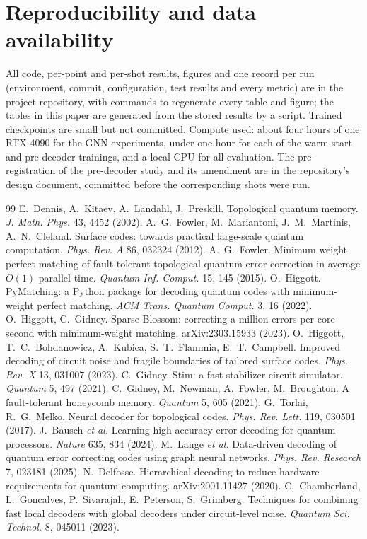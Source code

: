\documentclass[11pt]{article}
\begin{document}
\section*{Reproducibility and data availability}
All code, per-point and per-shot results, figures and one record per run (environment, commit, configuration, test results and every metric) are in the project repository, with commands to regenerate every table and figure; the tables in this paper are generated from the stored results by a script. Trained checkpoints are small but not committed. Compute used: about four hours of one RTX 4090 for the GNN experiments, under one hour for each of the warm-start and pre-decoder trainings, and a local CPU for all evaluation. The pre-registration of the pre-decoder study and its amendment are in the repository's design document, committed before the corresponding shots were run.

\begin{thebibliography}{99}\small
{} E.~Dennis, A.~Kitaev, A.~Landahl, J.~Preskill. Topological quantum memory. \emph{J. Math. Phys.} 43, 4452 (2002).
 A.~G.~Fowler, M.~Mariantoni, J.~M.~Martinis, A.~N.~Cleland. Surface codes: towards practical large-scale quantum computation. \emph{Phys. Rev. A} 86, 032324 (2012).
 A.~G.~Fowler. Minimum weight perfect matching of fault-tolerant topological quantum error correction in average $O(1)$ parallel time. \emph{Quantum Inf. Comput.} 15, 145 (2015).
 O.~Higgott. PyMatching: a Python package for decoding quantum codes with minimum-weight perfect matching. \emph{ACM Trans. Quantum Comput.} 3, 16 (2022).
 O.~Higgott, C.~Gidney. Sparse Blossom: correcting a million errors per core second with minimum-weight matching. arXiv:2303.15933 (2023).
 O.~Higgott, T.~C.~Bohdanowicz, A.~Kubica, S.~T.~Flammia, E.~T.~Campbell. Improved decoding of circuit noise and fragile boundaries of tailored surface codes. \emph{Phys. Rev. X} 13, 031007 (2023).
 C.~Gidney. Stim: a fast stabilizer circuit simulator. \emph{Quantum} 5, 497 (2021).
 C.~Gidney, M.~Newman, A.~Fowler, M.~Broughton. A fault-tolerant honeycomb memory. \emph{Quantum} 5, 605 (2021).
 G.~Torlai, R.~G.~Melko. Neural decoder for topological codes. \emph{Phys. Rev. Lett.} 119, 030501 (2017).
 J.~Bausch \emph{et al.} Learning high-accuracy error decoding for quantum processors. \emph{Nature} 635, 834 (2024).
 M.~Lange \emph{et al.} Data-driven decoding of quantum error correcting codes using graph neural networks. \emph{Phys. Rev. Research} 7, 023181 (2025).
 N.~Delfosse. Hierarchical decoding to reduce hardware requirements for quantum computing. arXiv:2001.11427 (2020).
 C.~Chamberland, L.~Goncalves, P.~Sivarajah, E.~Peterson, S.~Grimberg. Techniques for combining fast local decoders with global decoders under circuit-level noise. \emph{Quantum Sci. Technol.} 8, 045011 (2023).
\end{thebibliography}
\end{document}
